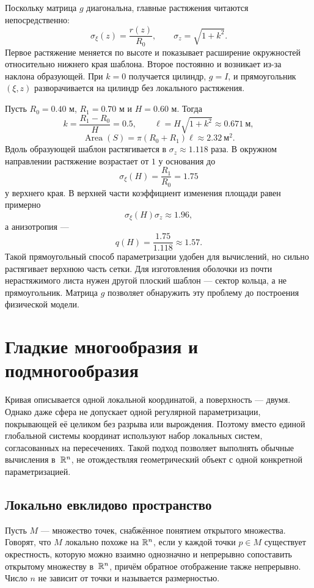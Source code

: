 Поскольку матрица \(g\) диагональна, главные растяжения читаются непосредственно:
\begin{equation}
\label{eq:conical-shell-stretches}
\sigma_\xi(z)=\frac{r(z)}{R_0},
\qquad
\sigma_z=\sqrt{1+k^2}.
\end{equation}
Первое растяжение меняется по высоте и показывает расширение окружностей относительно нижнего края шаблона. Второе постоянно и возникает из-за наклона образующей. При \(k=0\) получается цилиндр, \(g=I\), и прямоугольник \((\xi,z)\) разворачивается на цилиндр без локального растяжения.

Пусть \(R_0=0.40\) м, \(R_1=0.70\) м и \(H=0.60\) м. Тогда
\[
k=\frac{R_1-R_0}{H}=0.5,
\qquad
\ell=H\sqrt{1+k^2}\approx0.671\ \text{м},
\]
\[
\operatorname{Area}(S)
=\pi(R_0+R_1)\ell
\approx2.32\ \text{м}^2.
\]
Вдоль образующей шаблон растягивается в \(\sigma_z\approx1.118\) раза. В окружном направлении растяжение возрастает от \(1\) у основания до
\[
\sigma_\xi(H)=\frac{R_1}{R_0}=1.75
\]
у верхнего края. В верхней части коэффициент изменения площади равен примерно
\[
\sigma_\xi(H)\sigma_z\approx1.96,
\]
а анизотропия ---
\[
q(H)=\frac{1.75}{1.118}\approx1.57.
\]
Такой прямоугольный способ параметризации удобен для вычислений, но сильно растягивает верхнюю часть сетки. Для изготовления оболочки из почти нерастяжимого листа нужен другой плоский шаблон --- сектор кольца, а не прямоугольник. Матрица \(g\) позволяет обнаружить эту проблему до построения физической модели.

\section{Гладкие многообразия и подмногообразия}
\label{sec:smooth-manifolds-submanifolds}

Кривая описывается одной локальной координатой, а поверхность --- двумя. Однако даже сфера не допускает одной регулярной параметризации, покрывающей её целиком без разрыва или вырождения. Поэтому вместо единой глобальной системы координат используют набор локальных систем, согласованных на пересечениях. Такой подход позволяет выполнять обычные вычисления в~\(\mathbb{R}^n\), не отождествляя геометрический объект с одной конкретной параметризацией.

\subsection{Локально евклидово пространство}

Пусть \(M\) --- множество точек, снабжённое понятием открытого множества. Говорят, что \(M\) локально похоже на \(\mathbb{R}^n\), если у каждой точки \(p\in M\) существует окрестность, которую можно взаимно однозначно и непрерывно сопоставить открытому множеству в~\(\mathbb{R}^n\), причём обратное отображение также непрерывно. Число \(n\) не зависит от точки и называется размерностью.

